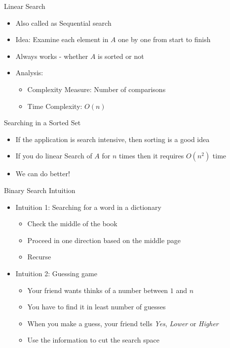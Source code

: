 \documentclass{beamer}
\begin{document}
\begin{frame}{Linear Search}
\begin{itemize}
\item Also called as Sequential search
\item Idea: Examine each element in $A$ one by one from start to finish
\item Always works - whether $A$ is sorted or not
\item Analysis: \pause
\begin{itemize}
    \item Complexity Measure: Number of comparisons
    \item Time Complexity: $O(n)$
\end{itemize}
\end{itemize}
\end{frame}



\begin{frame}{Searching in a Sorted Set}
\begin{itemize}
\item If the application is search intensive, then sorting is a good idea
\item If you do linear Search of $A$ for $n$ times then it requires $O(n^2)$ time
\item We can do better!
\end{itemize}
\end{frame}



\begin{frame}{Binary Search Intuition}
\begin{itemize}
\item Intuition 1: Searching for a word in a dictionary \pause
\begin{itemize}
    \item Check the middle of the book
    \item Proceed in one direction based on the middle page
    \item Recurse
\end{itemize}
\item Intuition 2: Guessing game \pause
\begin{itemize}
    \item Your friend wants thinks of a number between $1$ and $n$ 
    \item You have to find it in least number of guesses
    \item When you make a guess, your friend tells {\em Yes}, {\em Lower} or {\em Higher}
    \item Use the information to cut the search space
\end{itemize}
\end{itemize}
\end{frame}
\end{document}
